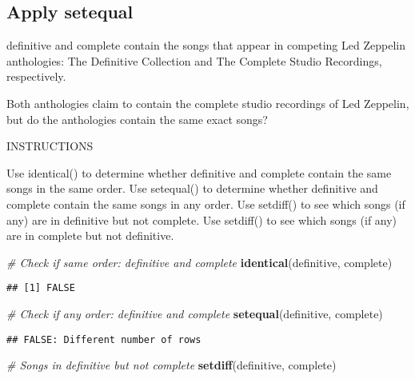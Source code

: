 \documentclass[]{article}
\newenvironment{Shaded}{\begin{snugshade}}{\end{snugshade}}
\newcommand{\KeywordTok}[1]{\textcolor[rgb]{0.13,0.29,0.53}{\textbf{#1}}}
\newcommand{\CommentTok}[1]{\textcolor[rgb]{0.56,0.35,0.01}{\textit{#1}}}
\newcommand{\NormalTok}[1]{#1}
\begin{document}
\subsection{Apply setequal}\label{apply-setequal}

definitive and complete contain the songs that appear in competing Led
Zeppelin anthologies: The Definitive Collection and The Complete Studio
Recordings, respectively.

Both anthologies claim to contain the complete studio recordings of Led
Zeppelin, but do the anthologies contain the same exact songs?

INSTRUCTIONS

Use identical() to determine whether definitive and complete contain the
same songs in the same order. Use setequal() to determine whether
definitive and complete contain the same songs in any order. Use
setdiff() to see which songs (if any) are in definitive but not
complete. Use setdiff() to see which songs (if any) are in complete but
not definitive.

\begin{Shaded}
\begin{Highlighting}[]
\CommentTok{# Check if same order: definitive and complete}
\KeywordTok{identical}\NormalTok{(definitive, complete)}
\end{Highlighting}
\end{Shaded}

\begin{verbatim}
## [1] FALSE
\end{verbatim}

\begin{Shaded}
\begin{Highlighting}[]
\CommentTok{# Check if any order: definitive and complete}
\KeywordTok{setequal}\NormalTok{(definitive, complete)}
\end{Highlighting}
\end{Shaded}

\begin{verbatim}
## FALSE: Different number of rows
\end{verbatim}

\begin{Shaded}
\begin{Highlighting}[]
\CommentTok{# Songs in definitive but not complete}
\KeywordTok{setdiff}\NormalTok{(definitive, complete)}
\end{Highlighting}
\end{Shaded}
\end{document}
